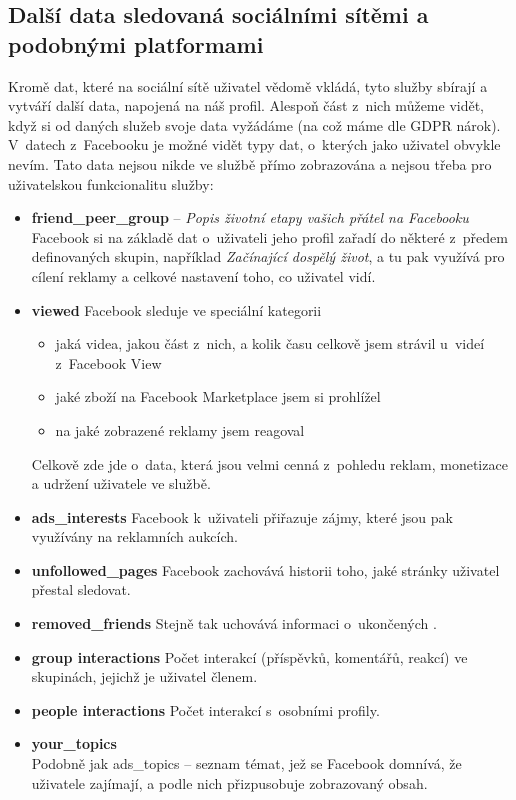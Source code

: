 \subsection{Další data sledovaná sociálními sítěmi a podobnými platformami}
Kromě dat, které na sociální sítě uživatel vědomě vkládá, tyto služby sbírají a vytváří další data, napojená na náš profil. Alespoň část z~nich můžeme vidět, když si od daných služeb svoje data vyžádáme (na což máme dle GDPR nárok).
V~datech z~Facebooku je možné vidět typy dat, o~kterých jako uživatel obvykle nevím. Tato data nejsou nikde ve službě přímo zobrazována a nejsou třeba pro  uživatelskou funkcionalitu služby:
\begin{itemize}
	\item \textbf{friend\_peer\_group} -- \textit{Popis životní etapy vašich přátel na Facebooku}\\
	Facebook si na základě dat o~uživateli jeho profil zařadí do některé z~předem definovaných skupin, například \textit{Začínající dospělý život}, a tu pak využívá pro cílení reklamy a celkové nastavení toho, co uživatel vidí.
	
	\item \textbf{viewed}
	Facebook sleduje ve speciální kategorii
	\begin{itemize}
		\item jaká videa, jakou část z~nich, a kolik času celkově jsem strávil u~videí z~Facebook View
		\item jaké zboží na Facebook Marketplace jsem si prohlížel
		\item na jaké zobrazené reklamy jsem reagoval
	\end{itemize}
	Celkově zde jde o~data, která jsou velmi cenná z~pohledu reklam, monetizace a udržení uživatele ve službě.
	
	\item \textbf{ads\_interests}
	Facebook k~uživateli přiřazuje zájmy, které jsou pak využívány na reklamních aukcích.

	\item \textbf{unfollowed\_pages}
	Facebook zachovává historii toho, jaké stránky uživatel přestal sledovat.

	\item \textbf{removed\_friends}
	Stejně tak uchovává informaci o~ukončených .

	\item \textbf{group interactions}
	Počet interakcí (příspěvků, komentářů, reakcí) ve skupinách, jejichž je uživatel členem.

	\item \textbf{people interactions}
	Počet interakcí s~osobními profily.

	\item \textbf{your\_topics}\\
	Podobně jak ads\_topics -- seznam témat, jež se Facebook domnívá, že uživatele zajímají, a podle nich přizpusobuje zobrazovaný obsah.
\end{itemize}

